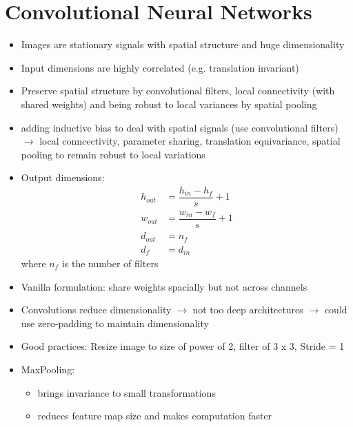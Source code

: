\section{Convolutional Neural Networks}
\begin{itemize}
	\item Images are stationary signals with spatial structure and huge dimensionality
	\item Input dimensions are highly correlated (e.g. translation invariant)
	\item Preserve spatial structure by convolutional filters, local connectivity (with shared weights) and being robust to local variances by spatial pooling
	\item adding inductive bias to deal with spatial signals (use convolutional filters) $\rightarrow$ local conncectivity, parameter sharing, translation equivariance, spatial pooling to remain robust to local variations
	\item Output dimensions: $$\begin{aligned} h_{out} &= \dfrac{h_{in}-h_f}{s} + 1 \\ w_{out} &= \dfrac{w_{in}-w_f}{s} + 1 \\ d_{out} &= n_f \\ d_f &= d_{in} \end{aligned}$$ where $n_f$ is the number of filters
	\item Vanilla formulation: share weights spacially but not across channels
	\item Convolutions reduce dimensionality $\rightarrow$ not too deep architectures $\rightarrow$ could use zero-padding to maintain dimensionality
	\item Good practices: Resize image to size of power of 2, filter of 3 x 3, Stride = 1
	\item MaxPooling:
	\begin{itemize}
		\item brings invariance to small transformations
		\item reduces feature map size and makes computation faster
	\end{itemize}
\end{itemize}
